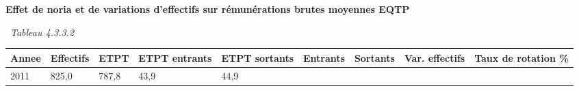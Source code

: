 \textbf{Effet de noria et de variations d'effectifs sur rémunérations
brutes moyennes EQTP}

~\emph{Tableau 4.3.3.2}

\begin{longtable}[]{@{}lllllllll@{}}
\toprule
\begin{minipage}[b]{0.05\columnwidth}\raggedright
Annee\strut
\end{minipage} & \begin{minipage}[b]{0.08\columnwidth}\raggedright
Effectifs\strut
\end{minipage} & \begin{minipage}[b]{0.05\columnwidth}\raggedright
ETPT\strut
\end{minipage} & \begin{minipage}[b]{0.10\columnwidth}\raggedright
ETPT entrants\strut
\end{minipage} & \begin{minipage}[b]{0.10\columnwidth}\raggedright
ETPT sortants\strut
\end{minipage} & \begin{minipage}[b]{0.07\columnwidth}\raggedright
Entrants\strut
\end{minipage} & \begin{minipage}[b]{0.07\columnwidth}\raggedright
Sortants\strut
\end{minipage} & \begin{minipage}[b]{0.11\columnwidth}\raggedright
Var. effectifs\strut
\end{minipage} & \begin{minipage}[b]{0.14\columnwidth}\raggedright
Taux de rotation \%\strut
\end{minipage}\tabularnewline
\midrule
\endhead
\begin{minipage}[t]{0.05\columnwidth}\raggedright
2011\strut
\end{minipage} & \begin{minipage}[t]{0.08\columnwidth}\raggedright
825,0\strut
\end{minipage} & \begin{minipage}[t]{0.05\columnwidth}\raggedright
787,8\strut
\end{minipage} & \begin{minipage}[t]{0.10\columnwidth}\raggedright
43,9\strut
\end{minipage} & \begin{minipage}[t]{0.10\columnwidth}\raggedright
44,9\strut
\end{minipage} & \begin{minipage}[t]{0.07\columnwidth}\raggedright

\end{minipage}
\end{longtable}
